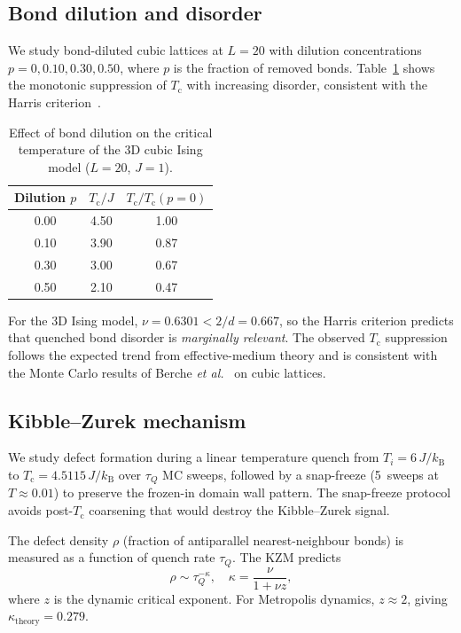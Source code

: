\documentclass[twocolumn,showpacs,preprintnumbers,amsmath,amssymb,pra,floatfix]{revtex4-2}
\newcommand{\Tc}{T_{\mathrm{c}}}
\newcommand{\kB}{k_{\mathrm{B}}}
\begin{document}
\subsection{Bond dilution and disorder}
\label{sec:dilution}

We study bond-diluted cubic lattices at $L = 20$ with dilution concentrations
$p = 0, 0.10, 0.30, 0.50$, where $p$ is the fraction of removed bonds.
Table~\ref{tab:dilution} shows the monotonic suppression of $\Tc$ with increasing
disorder, consistent with the Harris criterion~\cite{Harris1974}.

\begin{table}[t]
\caption{Effect of bond dilution on the critical temperature of the 3D cubic Ising
model ($L=20$, $J=1$).}
\label{tab:dilution}
\begin{ruledtabular}
\begin{tabular}{ccc}
Dilution $p$ & $\Tc/J$ & $\Tc/\Tc(p=0)$ \\
\hline
0.00 & 4.50 & 1.00 \\
0.10 & 3.90 & 0.87 \\
0.30 & 3.00 & 0.67 \\
0.50 & 2.10 & 0.47 \\
\end{tabular}
\end{ruledtabular}
\end{table}

For the 3D Ising model, $\nu = 0.6301 < 2/d = 0.667$, so the Harris criterion
predicts that quenched bond disorder is \emph{marginally relevant}. The observed
$\Tc$ suppression follows the expected trend from effective-medium theory and is
consistent with the Monte Carlo results of Berche \textit{et al.}~\cite{Berche2004}
on cubic lattices.

\subsection{Kibble--Zurek mechanism}
\label{sec:kz}

We study defect formation during a linear temperature quench from $T_i = 6 \, J/\kB$
to $\Tc = 4.5115 \, J/\kB$ over $\tau_Q$ MC sweeps, followed by a snap-freeze
(5~sweeps at $T \approx 0.01$) to preserve the frozen-in domain wall pattern.
The snap-freeze protocol avoids post-$\Tc$ coarsening that would destroy the
Kibble--Zurek signal.

The defect density $\rho$ (fraction of antiparallel nearest-neighbour bonds) is
measured as a function of quench rate $\tau_Q$. The KZM predicts
\begin{equation}
    \rho \sim \tau_Q^{-\kappa}, \quad \kappa = \frac{\nu}{1 + \nu z},
\end{equation}
where $z$ is the dynamic critical exponent. For Metropolis dynamics, $z \approx 2$,
giving $\kappa_{\mathrm{theory}} = 0.279$.
\end{document}
